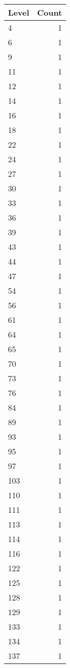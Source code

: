 \begin{table}[ht]
\centering
\begin{tabular}{lr}
  \hline
Level & Count \\ 
  \hline
4 &   1 \\ 
  6 &   1 \\ 
  9 &   1 \\ 
  11 &   1 \\ 
  12 &   1 \\ 
  14 &   1 \\ 
  16 &   1 \\ 
  18 &   1 \\ 
  22 &   1 \\ 
  24 &   1 \\ 
  27 &   1 \\ 
  30 &   1 \\ 
  33 &   1 \\ 
  36 &   1 \\ 
  39 &   1 \\ 
  43 &   1 \\ 
  44 &   1 \\ 
  47 &   1 \\ 
  54 &   1 \\ 
  56 &   1 \\ 
  61 &   1 \\ 
  64 &   1 \\ 
  65 &   1 \\ 
  70 &   1 \\ 
  73 &   1 \\ 
  76 &   1 \\ 
  84 &   1 \\ 
  89 &   1 \\ 
  93 &   1 \\ 
  95 &   1 \\ 
  97 &   1 \\ 
  103 &   1 \\ 
  110 &   1 \\ 
  111 &   1 \\ 
  113 &   1 \\ 
  114 &   1 \\ 
  116 &   1 \\ 
  122 &   1 \\ 
  125 &   1 \\ 
  128 &   1 \\ 
  129 &   1 \\ 
  133 &   1 \\ 
  134 &   1 \\ 
  137 &   1 \\ 

\end{tabular}
\end{table}
